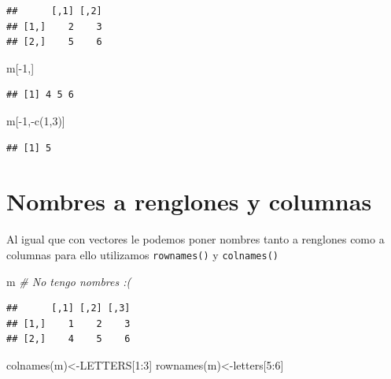 \documentclass[
]{book}
\newenvironment{Shaded}{\begin{snugshade}}{\end{snugshade}}
\newcommand{\CommentTok}[1]{\textcolor[rgb]{0.56,0.35,0.01}{\textit{#1}}}
\newcommand{\DecValTok}[1]{\textcolor[rgb]{0.00,0.00,0.81}{#1}}
\newcommand{\FunctionTok}[1]{\textcolor[rgb]{0.00,0.00,0.00}{#1}}
\newcommand{\NormalTok}[1]{#1}
\newcommand{\OtherTok}[1]{\textcolor[rgb]{0.56,0.35,0.01}{#1}}
\newcommand{\SpecialCharTok}[1]{\textcolor[rgb]{0.00,0.00,0.00}{#1}}
\begin{document}
\begin{verbatim}
##      [,1] [,2]
## [1,]    2    3
## [2,]    5    6
\end{verbatim}

\begin{Shaded}
\begin{Highlighting}[]
\NormalTok{m[}\SpecialCharTok{{-}}\DecValTok{1}\NormalTok{,]}
\end{Highlighting}
\end{Shaded}

\begin{verbatim}
## [1] 4 5 6
\end{verbatim}

\begin{Shaded}
\begin{Highlighting}[]
\NormalTok{m[}\SpecialCharTok{{-}}\DecValTok{1}\NormalTok{,}\SpecialCharTok{{-}}\FunctionTok{c}\NormalTok{(}\DecValTok{1}\NormalTok{,}\DecValTok{3}\NormalTok{)]}
\end{Highlighting}
\end{Shaded}

\begin{verbatim}
## [1] 5
\end{verbatim}

\hypertarget{nombres-a-renglones-y-columnas}{%
\section{Nombres a renglones y columnas}\label{nombres-a-renglones-y-columnas}}

Al igual que con vectores le podemos poner nombres tanto a renglones como a columnas para ello utilizamos \texttt{rownames()} y \texttt{colnames()}

\begin{Shaded}
\begin{Highlighting}[]
\NormalTok{m   }\CommentTok{\# No tengo nombres :(}
\end{Highlighting}
\end{Shaded}

\begin{verbatim}
##      [,1] [,2] [,3]
## [1,]    1    2    3
## [2,]    4    5    6
\end{verbatim}

\begin{Shaded}
\begin{Highlighting}[]
\FunctionTok{colnames}\NormalTok{(m)}\OtherTok{\textless{}{-}}\NormalTok{LETTERS[}\DecValTok{1}\SpecialCharTok{:}\DecValTok{3}\NormalTok{]}
\FunctionTok{rownames}\NormalTok{(m)}\OtherTok{\textless{}{-}}\NormalTok{letters[}\DecValTok{5}\SpecialCharTok{:}\DecValTok{6}\NormalTok{]}
\end{Highlighting}
\end{Shaded}
\end{document}
